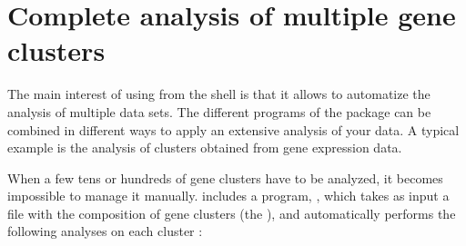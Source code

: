 \chapter{Complete analysis of multiple gene clusters}

The main interest of using \RSAT from the shell is that it allows to
automatize the analysis of multiple data sets. The different programs
of the package can be combined in different ways to apply an extensive
analysis of your data. A typical example is the analysis of clusters
obtained from gene expression data.

When a few tens or hundreds of gene clusters have to be analyzed, it
becomes impossible to manage it manually. \RSAT includes a program,
, which takes as input a file with
the composition of gene clusters (the ), and
automatically performs the following analyses on each cluster :


